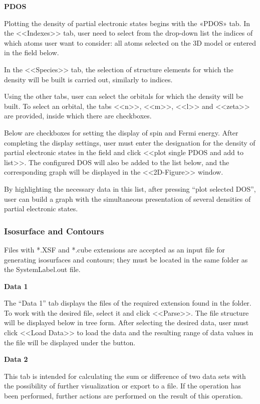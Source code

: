 \documentclass{article}
\begin{document}
\textbf{PDOS}

Plotting the density of partial electronic states begins with the «PDOS» tab. In the <<Indexes>> tab, user need to select from the drop-down list the indices of which atoms user want to consider: all atoms selected on the 3D model or entered in the field below. 

In the <<Species>> tab, the selection of structure elements for which the density will be built is carried out, similarly to indices.

Using the other tabs, user can select the orbitals for which the density will be built. To select an orbital, the tabs <<n>>, <<m>>, <<l>> and <<zeta>> are provided, inside which there are checkboxes.

Below are checkboxes for setting the display of spin and Fermi energy.
After completing the display settings, user must enter the designation for the density of partial electronic states in the field and click <<plot single PDOS and add to list>>. The configured DOS will also be added to the list below, and the corresponding graph will be displayed in the <<2D-Figure>> window.

By highlighting the necessary data in this list, after pressing “plot selected DOS”, user can build a graph with the simultaneous presentation of several densities of partial electronic states.

\subsubsection{Isosurface and Contours}

Files with *.XSF and *.cube extensions are accepted as an input file for generating isosurfaces and contours; they must be located in the same folder as the SystemLabel.out file. 

\textbf{Data 1}

The “Data 1” tab displays the files of the required extension found in the folder. To work with the desired file, select it and click <<Parse>>. The file structure will be displayed below in tree form. After selecting the desired data, user must click <<Load Data>> to load the data and the resulting range of data values in the file will be displayed under the button.

\textbf{Data 2}

This tab is intended for calculating the sum or difference of two data sets with the possibility of further visualization or export to a file. If the operation has been performed, further actions are performed on the result of this operation.
\end{document}

